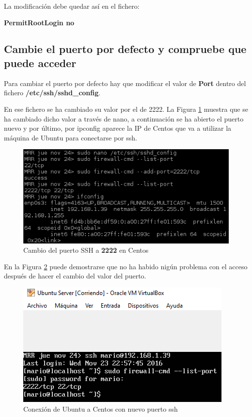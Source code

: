  La modificación debe quedar así en el fichero:

\textbf{PermitRootLogin no}

\subsection{Cambie el puerto por defecto y compruebe que puede acceder}	

Para cambiar el puerto por defecto hay que modificar el valor de \textbf{Port} dentro del fichero \textbf{ /etc/ssh/sshd\_config}.

En ese fichero se ha cambiado su valor por el de 2222.
La Figura \ref{fig:figura104} muestra que se ha cambiado dicho valor a través de nano, a continuación se ha abierto el puerto nuevo y por último, por ipconfig aparece la IP de Centos que va a utilizar la máquina de Ubuntu para conectarse por ssh.
\begin{figure}[H] %
	\centering
	\includegraphics[scale=0.9]{figuras/figura104.png} 
	\caption{Cambio del puerto SSH a \textbf{2222} en Centos} 
	\label{fig:figura104}
\end{figure}

En la Figura \ref{fig:figura105} puede demostrarse que no ha habido nigún problema con el acceso después de hacer el cambio del valor del puerto.

\begin{figure}[H] %
	\centering
	\includegraphics[scale=0.9]{figuras/figura105.png} 
	\caption{Conexión de Ubuntu a Centos con nuevo puerto ssh} 
	\label{fig:figura105}
\end{figure}

